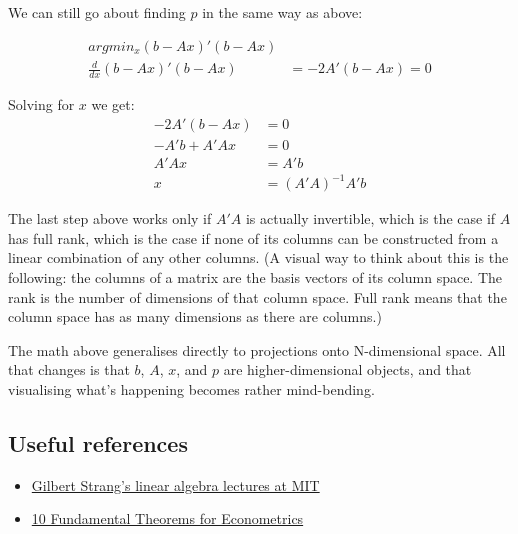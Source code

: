 \documentclass[
  letterpaper,
  DIV=11,
  numbers=noendperiod]{scrartcl}
\begin{document}
We can still go about finding \(p\) in the same way as above:

\[
\begin{aligned}
argmin_{x} (b - Ax)'(b - Ax) \\
\frac{d}{dx} (b - Ax)'(b - Ax) &= -2A'(b - Ax) = 0
\end{aligned}
\]

Solving for \(x\) we get: \[
\begin{aligned}
-2A'(b - Ax) &= 0 \\
-A'b + A'Ax &= 0 \\
A'Ax &= A'b \\
x &= (A'A)^{-1}A'b
\end{aligned}
\]

The last step above works only if \(A'A\) is actually invertible, which
is the case if \(A\) has full rank, which is the case if none of its
columns can be constructed from a linear combination of any other
columns. (A visual way to think about this is the following: the columns
of a matrix are the basis vectors of its column space. The rank is the
number of dimensions of that column space. Full rank means that the
column space has as many dimensions as there are columns.)

The math above generalises directly to projections onto N-dimensional
space. All that changes is that \(b\), \(A\), \(x\), and \(p\) are
higher-dimensional objects, and that visualising what's happening
becomes rather mind-bending.

\hypertarget{useful-references}{%
\subsection{Useful references}\label{useful-references}}

\begin{itemize}
\item
  \href{https://ocw.mit.edu/courses/18-06-linear-algebra-spring-2010/video_galleries/video-lectures/}{Gilbert
  Strang's linear algebra lectures at MIT}
\item
  \href{https://bookdown.org/ts_robinson1994/10EconometricTheorems/linear_projection.html\#linear_projection}{10
  Fundamental Theorems for Econometrics}
\end{itemize}
\end{document}
